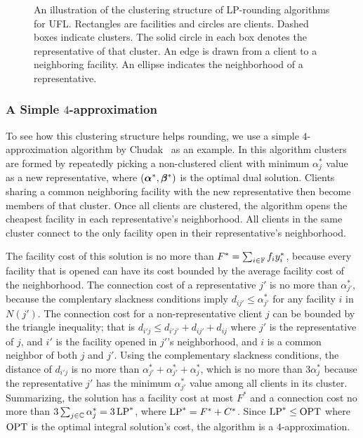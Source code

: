 \documentclass[oneside,final]{ucr}
\def\dsp{\def\baselinestretch{2.0}\large\normalsize}
\def\ssp{\def\baselinestretch{1.0}\large\normalsize}
\begin{document}
\begin{figure}[ht]
  \ssp
  \caption[Illustration of the clustering structure of
  LP-rounding algorithms for UFL]{An illustration of the
    clustering structure of LP-rounding algorithms for
    UFL. Rectangles are facilities and circles are
    clients. Dashed boxes indicate clusters. The solid
    circle in each box denotes the representative of that
    cluster. An edge is drawn from a client to a neighboring
    facility. An ellipse indicates the neighborhood of a
    representative.}
  \label{fig:STA97}
\end{figure}
\dsp

\subsubsection{A Simple $4$-approximation}
To see how this clustering structure helps rounding, we use
a simple $4$-approximation algorithm by
Chudak~\cite{Chudak98} as an example. In this algorithm
clusters are formed by repeatedly picking a non-clustered
client with minimum $\alpha_j^\ast$ value as a new
representative, where $(\boldsymbol{\alpha}^\ast,\boldsymbol{\beta}^\ast)$ is the
optimal dual solution. Clients sharing a common neighboring
facility with the new representative then become members of
that cluster. Once all clients are clustered, the algorithm
opens the cheapest facility in each representative's
neighborhood. All clients in the same cluster connect to the
only facility open in their representative's neighborhood.

The facility cost of this solution is no more than $F^\ast =
\sum_{i\in\mathbb{F}} f_i y_i^\ast$, because every facility
that is opened can have its cost bounded by the average
facility cost of the neighborhood. The connection cost of a
representative $j'$ is no more than $\alpha_{j'}^\ast$,
because the complentary slackness conditions imply $d_{ij'}
\leq \alpha_{j'}^\ast$ for any facility $i$ in $N(j')$. The
connection cost for a non-representative client $j$ can be
bounded by the triangle inequality; that is $d_{i'j} \leq
d_{i'j'} + d_{ij'} + d_{ij}$ where $j'$ is the
representative of $j$, and $i'$ is the facility opened in
$j'$'s neighborhood, and $i$ is a common neighbor of both
$j$ and $j'$. Using the complementary slackness conditions,
the distance of $d_{i'j}$ is no more than $\alpha_{j'}^\ast
+ \alpha_{j'}^\ast + \alpha_j^\ast$, which is no more than
$3\alpha_j^\ast$ because the representative $j'$ has the
minimum $\alpha_{j'}^\ast$ value among all clients in its
cluster. Summarizing, the solution has a facility cost at
most $F^\ast$ and a connection cost no more than
$3\sum_{j\in\mathbb{C}} \alpha_j^\ast = 3\,\mbox{\rm LP}^\ast$, where
$\mbox{\rm LP}^\ast = F^\ast + C^\ast$. Since $\mbox{\rm LP}^\ast \leq \mbox{\rm OPT}$
where $\mbox{\rm OPT}$ is the optimal integral solution's cost, the
algorithm is a $4$-approximation.
\end{document}

